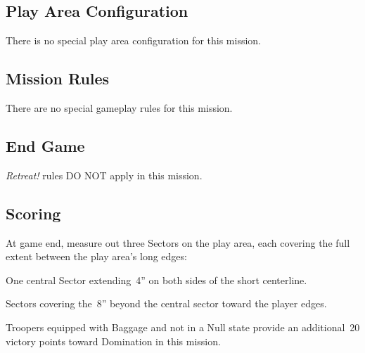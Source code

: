 \label{mission:frontline}

\subsection{Play Area Configuration}

There is no special play area configuration for this mission.

\subsection{Mission Rules}

There are no special gameplay rules for this mission.

\subsection{End Game}

\emph{Retreat!} rules DO NOT apply in this mission.


\subsection{Scoring}


  At game end, measure out three Sectors on the
play area, each covering the full extent between the play area's long
edges:

\begin{squishitemize}
\item One central Sector extending~4'' on both sides of the short
  centerline.
\item Sectors covering the~8'' beyond the central sector toward the
  player edges.
\end{squishitemize}

 Troopers equipped with Baggage and
not in a Null state provide an additional~20 victory points toward
Domination in this mission.


